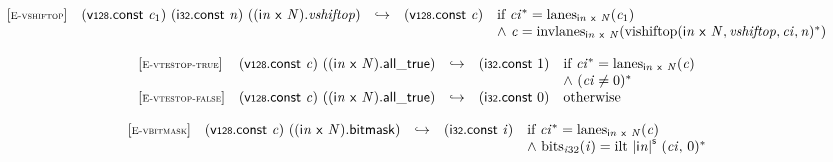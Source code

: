 $$
\begin{array}{@{}l@{}lcl@{}l@{}}
{[\textsc{\scriptsize E{-}vshiftop}]} \quad & (\mathsf{v{\scriptstyle128}}.\mathsf{const}~{\mathit{c}}_{{1}})~(\mathsf{i{\scriptstyle32}}.\mathsf{const}~{\mathit{n}})~(({\mathsf{i}}{{\mathit{n}}}~\mathsf{x}~{\mathit{N}}) . {\mathit{vshiftop}}) &\hookrightarrow& (\mathsf{v{\scriptstyle128}}.\mathsf{const}~{\mathit{c}}) &\quad
  \mbox{if}~{{\mathit{ci}}^\ast} = {{\mathrm{lanes}}}_{{\mathsf{i}}{{\mathit{n}}}~\mathsf{x}~{\mathit{N}}}({\mathit{c}}_{{1}}) \\
 &&&&\quad {\land}~{\mathit{c}} = {{\mathrm{invlanes}}}_{{\mathsf{i}}{{\mathit{n}}}~\mathsf{x}~{\mathit{N}}}({{\mathrm{vishiftop}}({\mathsf{i}}{{\mathit{n}}}~\mathsf{x}~{\mathit{N}}, {\mathit{vshiftop}}, {\mathit{ci}}, {\mathit{n}})^\ast}) \\
\end{array}
$$

\vspace{1ex}

$$
\begin{array}{@{}l@{}lcl@{}l@{}}
{[\textsc{\scriptsize E{-}vtestop{-}true}]} \quad & (\mathsf{v{\scriptstyle128}}.\mathsf{const}~{\mathit{c}})~(({\mathsf{i}}{{\mathit{n}}}~\mathsf{x}~{\mathit{N}}) . \mathsf{all\_true}) &\hookrightarrow& (\mathsf{i{\scriptstyle32}}.\mathsf{const}~1) &\quad
  \mbox{if}~{{\mathit{ci}}^\ast} = {{\mathrm{lanes}}}_{{\mathsf{i}}{{\mathit{n}}}~\mathsf{x}~{\mathit{N}}}({\mathit{c}}) \\
 &&&&\quad {\land}~({\mathit{ci}} \neq 0)^\ast \\
{[\textsc{\scriptsize E{-}vtestop{-}false}]} \quad & (\mathsf{v{\scriptstyle128}}.\mathsf{const}~{\mathit{c}})~(({\mathsf{i}}{{\mathit{n}}}~\mathsf{x}~{\mathit{N}}) . \mathsf{all\_true}) &\hookrightarrow& (\mathsf{i{\scriptstyle32}}.\mathsf{const}~0) &\quad
  \mbox{otherwise} \\
\end{array}
$$

\vspace{1ex}

$$
\begin{array}{@{}l@{}lcl@{}l@{}}
{[\textsc{\scriptsize E{-}vbitmask}]} \quad & (\mathsf{v{\scriptstyle128}}.\mathsf{const}~{\mathit{c}})~(({\mathsf{i}}{{\mathit{n}}}~\mathsf{x}~{\mathit{N}}).\mathsf{bitmask}) &\hookrightarrow& (\mathsf{i{\scriptstyle32}}.\mathsf{const}~{\mathit{i}}) &\quad
  \mbox{if}~{{\mathit{ci}}^\ast} = {{\mathrm{lanes}}}_{{\mathsf{i}}{{\mathit{n}}}~\mathsf{x}~{\mathit{N}}}({\mathit{c}}) \\
 &&&&\quad {\land}~{{\mathrm{bits}}}_{{{\mathit{i}}}{32}}({\mathit{i}}) = {{\mathrm{ilt}}~{{|{\mathsf{i}}{{\mathit{n}}}|}^{\mathsf{s}}}~({\mathit{ci}},\, 0)^\ast} \\
\end{array}
$$

